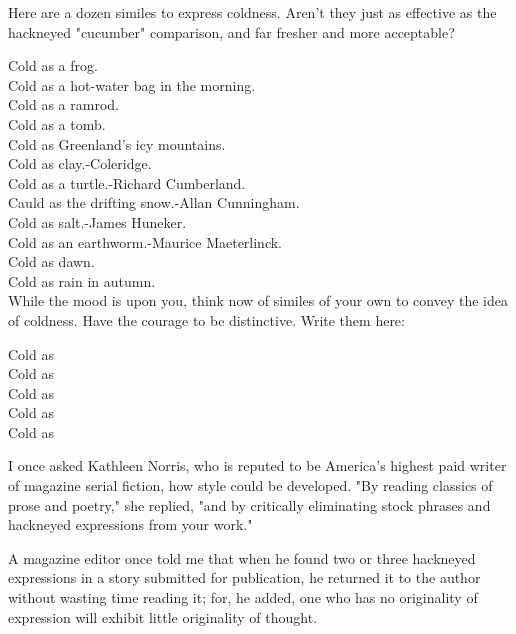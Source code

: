 \documentclass[10pt]{article}
\begin{document}
Here are a dozen similes to express coldness. Aren't they just as effective as the hackneyed "cucumber" comparison, and far fresher and more acceptable?

Cold as a frog.\\
Cold as a hot-water bag in the morning.\\
Cold as a ramrod.\\
Cold as a tomb.\\
Cold as Greenland's icy mountains.\\
Cold as clay.-Coleridge.\\
Cold as a turtle.-Richard Cumberland.\\
Cauld as the drifting snow.-Allan Cunningham.\\
Cold as salt.-James Huneker.\\
Cold as an earthworm.-Maurice Maeterlinck.\\
Cold as dawn.\\
Cold as rain in autumn.\\
While the mood is upon you, think now of similes of your own to convey the idea of coldness. Have the courage to be distinctive. Write them here:

Cold as\\
Cold as\\
Cold as\\
Cold as\\
Cold as

I once asked Kathleen Norris, who is reputed to be America's highest paid writer of magazine serial fiction, how style could be developed. "By reading classics of prose and poetry," she replied, "and by critically eliminating stock phrases and hackneyed expressions from your work."

A magazine editor once told me that when he found two or three hackneyed expressions in a story submitted for publication, he returned it to the author without wasting time reading it; for, he added, one who has no originality of expression will exhibit little originality of thought.
\end{document}
